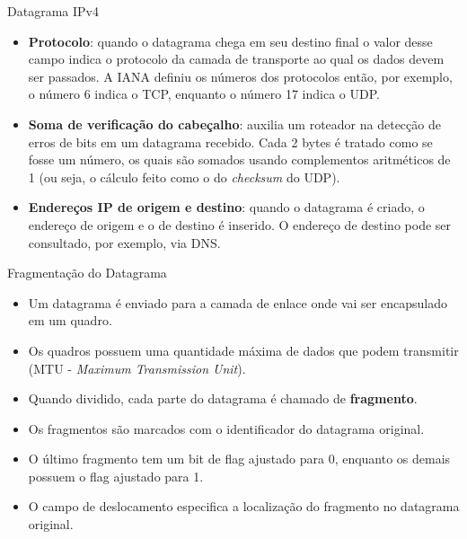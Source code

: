 \documentclass{libs/ufc_format}
\begin{document}
\begin{frame}{Datagrama IPv4}
    \begin{itemize}
        \justifying
        \item \textbf{Protocolo}: quando o datagrama chega em seu destino final o valor desse campo indica o protocolo da camada de transporte ao qual os dados devem ser passados. A IANA definiu os números dos protocolos então, por exemplo, o número 6 indica o TCP, enquanto o número 17 indica o UDP.
        \item<2-> \textbf{Soma de verificação do cabeçalho}: auxilia um roteador na detecção de erros de bits em um datagrama recebido. Cada 2 bytes é tratado como se fosse um número, os quais são somados  usando complementos aritméticos de 1 (ou seja, o cálculo feito como o do \textit{checksum} do UDP).
        \item<3-> \textbf{Endereços IP de origem e destino}: quando o datagrama é criado, o endereço de origem e o de destino é inserido. O endereço de destino pode ser consultado, por exemplo, via DNS.
    \end{itemize}
\end{frame}

\begin{frame}{Fragmentação do Datagrama}
    \begin{itemize}
        \justifying
        \item Um datagrama é enviado para a camada de enlace onde vai ser encapsulado em um quadro.
        \item Os quadros possuem uma quantidade máxima de dados que podem transmitir (MTU - \textit{Maximum Transmission Unit}).
        \item Quando dividido, cada parte do datagrama é chamado de \textbf{fragmento}.
        \item<2-> Os fragmentos são marcados com o identificador do datagrama original.
        \item<3-> O último fragmento tem um bit de flag ajustado para 0, enquanto os demais possuem o flag ajustado para 1.
        \item<4-> O campo de deslocamento especifica a localização do fragmento no datagrama original.
    \end{itemize}
\end{frame}
\end{document}
